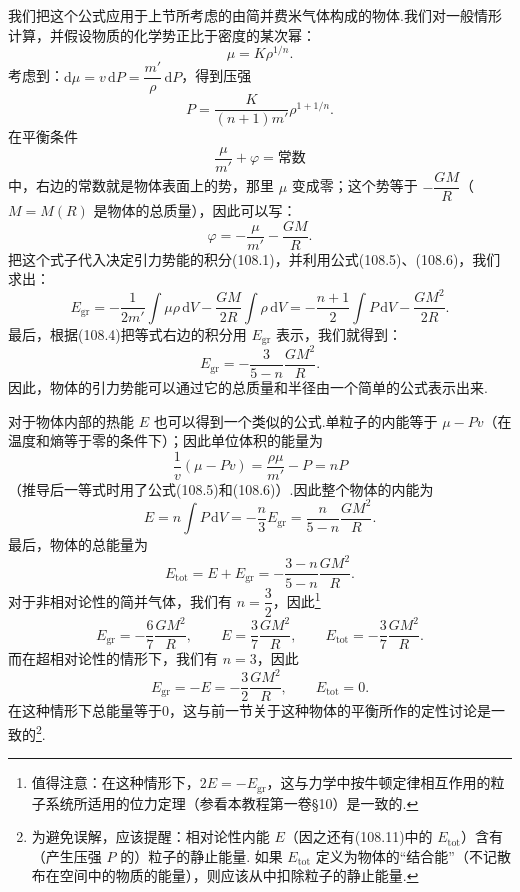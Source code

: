 我们把这个公式应用于上节所考虑的由简并费米气体构成的物体.我们对一般情形计算，并假设物质的化学势正比于密度的某次幂：
\begin{equation}
  \mu=K\rho^{1/n}.
\end{equation}
考虑到：$\mathrm{d}\mu=v\,\mathrm{d}P=\dfrac{m'}{\rho}\,\mathrm{d}P$，得到压强
\begin{equation}
  P=\frac{K}{(n+1)m'}\rho^{1+1/n}.
\end{equation}
在平衡条件
\begin{equation*}
  \frac{\mu}{m'}+\varphi=\text{常数}
\end{equation*}
中，右边的常数就是物体表面上的势，那里 $\mu$ 变成零；这个势等于 $-\dfrac{GM}{R}$（$M=M(R)$ 是物体的总质量），因此可以写：
\begin{equation*}
  \varphi=-\frac{\mu}{m'}-\frac{GM}{R}.
\end{equation*}
把这个式子代入决定引力势能的积分(108.1)，并利用公式(108.5)、(108.6)，我们求出：
\begin{equation*}
  E_{\mathrm{gr}}=-\frac{1}{2m'}\int\mu\rho\,\mathrm{d}V
  -\frac{GM}{2R}\int\rho\,\mathrm{d}V
  =-\frac{n+1}{2}\int P\,\mathrm{d}V-\frac{GM^2}{2R}.
\end{equation*}
最后，根据(108.4)把等式右边的积分用 $E_{\mathrm{gr}}$ 表示，我们就得到：
\begin{equation}
  E_{\mathrm{gr}}=-\frac{3}{5-n}\frac{GM^2}{R}.
\end{equation}
因此，物体的引力势能可以通过它的总质量和半径由一个简单的公式表示出来.

对于物体内部的热能 $E$ 也可以得到一个类似的公式.单粒子的内能等于 $\mu-Pv$（在温度和熵等于零的条件下）；因此单位体积的能量为
\begin{equation*}
  \frac1v(\mu-Pv)=\frac{\rho\mu}{m'}-P=nP
\end{equation*}
（推导后一等式时用了公式(108.5)和(108.6)）.因此整个物体的内能为
\begin{equation}
  E=n\int P\,\mathrm{d}V=-\frac n3E_{\mathrm{gr}}
  =\frac{n}{5-n}\frac{GM^2}{R}.
\end{equation}
最后，物体的总能量为
\begin{equation}
  E_{\mathrm{tot}}=E+E_{\mathrm{gr}}
  =-\frac{3-n}{5-n}\frac{GM^2}{R}.
\end{equation}
对于非相对论性的简并气体，我们有 $n=\dfrac32$，因此\footnote{值得注意：在这种情形下，$2E=-E_{\mathrm{gr}}$，这与力学中按牛顿定律相互作用的粒子系统所适用的位力定理（参看本教程第一卷§10）是一致的.}
\begin{equation}
  E_{\mathrm{gr}}=-\frac67\frac{GM^2}{R},\qquad
  E=\frac37\frac{GM^2}{R},\qquad
  E_{\mathrm{tot}}=-\frac37\frac{GM^2}{R}.
\end{equation}
而在超相对论性的情形下，我们有 $n=3$，因此
\begin{equation}
  E_{\mathrm{gr}}=-E=-\frac32\frac{GM^2}{R},\qquad
  E_{\mathrm{tot}}=0.
\end{equation}
在这种情形下总能量等于0，这与前一节关于这种物体的平衡所作的定性讨论是一致的\footnote{为避免误解，应该提醒：相对论性内能 $E$（因之还有(108.11)中的 $E_{\mathrm{tot}}$）含有（产生压强 $P$ 的）粒子的静止能量. 如果 $E_{\mathrm{tot}}$ 定义为物体的“结合能”（不记散布在空间中的物质的能量），则应该从中扣除粒子的静止能量.}.

